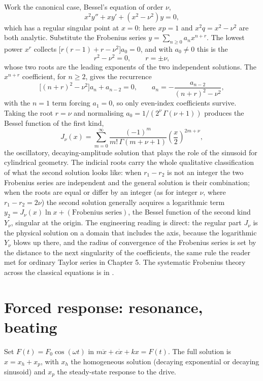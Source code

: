 Work the canonical case, Bessel's equation of order $\nu$,
\[
x^{2} y'' + x y' + (x^{2} - \nu^{2}) y = 0,
\]
which has a regular singular point at $x = 0$: here $x p = 1$ and
$x^{2} q = x^{2} - \nu^{2}$ are both analytic. Substitute the
Frobenius series $y = \sum_{n \geq 0} a_{n} x^{n+r}$. The lowest power
$x^{r}$ collects $\bigl[r(r-1) + r - \nu^{2}\bigr]a_{0} = 0$, and with
$a_{0} \neq 0$ this is the 
\[
r^{2} - \nu^{2} = 0, \qquad r = \pm\nu,
\]
whose two roots are the leading exponents of the two independent
solutions. The $x^{n+r}$ coefficient, for $n \geq 2$, gives the
recurrence
\[
\bigl[(n + r)^{2} - \nu^{2}\bigr]a_{n} + a_{n-2} = 0,
\qquad
a_{n} = -\frac{a_{n-2}}{(n + r)^{2} - \nu^{2}},
\]
with the $n = 1$ term forcing $a_{1} = 0$, so only even-index
coefficients survive. Taking the root $r = \nu$ and normalising $a_{0}
= 1/(2^{\nu}\,\Gamma(\nu + 1))$ produces the Bessel function of the
first kind,
\[
J_{\nu}(x) = \sum_{m = 0}^{\infty} \frac{(-1)^{m}}{m!\,
\Gamma(m + \nu + 1)}\left(\frac{x}{2}\right)^{2m + \nu},
\]
the oscillatory, decaying-amplitude solution that plays the role of the
sinusoid for cylindrical geometry. The indicial roots carry the whole
qualitative classification of what the second solution looks like: when
$r_{1} - r_{2}$ is not an integer the two Frobenius series are
independent and the general solution is their combination; when the
roots are equal or differ by an integer (as for integer $\nu$, where
$r_{1} - r_{2} = 2\nu$) the second solution generally acquires a
logarithmic term $y_{2} = J_{\nu}(x)\ln x + (\text{Frobenius series})$,
the Bessel function of the second kind $Y_{\nu}$, singular at the
origin. The engineering reading is direct: the regular part $J_{\nu}$
is the physical solution on a domain that includes the axis, because
the logarithmic $Y_{\nu}$ blows up there, and the radius of convergence
of the Frobenius series is set by the distance to the next singularity
of the coefficients, the same rule the reader met for ordinary Taylor
series in Chapter 5. The systematic Frobenius theory across the
classical equations is in \textcite{text:boyce-diprima}.

\section{Forced response: resonance, beating}

Set $F(t) = F_{0} \cos(\omega t)$ in $m \ddot{x} + c \dot{x} + k x =
F(t)$. The full solution is $x = x_{h} + x_{p}$, with $x_{h}$ the
homogeneous solution (decaying exponential or decaying sinusoid)
and $x_{p}$ the steady-state response to the drive.

